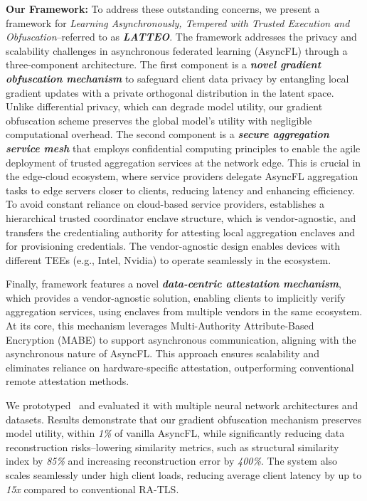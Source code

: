 \noindent
\textbf{Our Framework:}
To address these outstanding concerns, we present a framework for \emph{Learning Asynchronously, Tempered with Trusted Execution and Obfuscation}--referred to as \textit{\textbf{LATTEO}}. The \sysname framework addresses the privacy and scalability challenges in asynchronous federated learning (AsyncFL) through a three-component architecture. 
The first component is a \textit{\textbf{novel gradient obfuscation mechanism}} to safeguard client data privacy by entangling local gradient updates with a private orthogonal distribution in the latent space. Unlike differential privacy, which can degrade model utility, our gradient obfuscation scheme preserves the global model's utility with negligible computational overhead.
The second component is a \textit{\textbf{secure aggregation service mesh}} that employs confidential computing principles to enable the agile deployment of trusted aggregation services at the network edge. This is crucial in the edge-cloud ecosystem, where service providers delegate AsyncFL aggregation tasks to edge servers closer to clients, reducing latency and enhancing efficiency. To avoid constant reliance on cloud-based service providers, \sysname establishes a hierarchical trusted coordinator enclave structure, which is vendor-agnostic, and transfers the credentialing authority for attesting local aggregation enclaves and for provisioning credentials.
The vendor-agnostic design enables devices with different TEEs (e.g., Intel, Nvidia) to operate seamlessly in the ecosystem.    

Finally, \sysname framework features a novel \textit{\textbf{data-centric attestation mechanism}}, which provides a vendor-agnostic solution, enabling clients to implicitly verify aggregation services, using enclaves from multiple vendors in the same ecosystem. At its core, this mechanism leverages Multi-Authority Attribute-Based Encryption (MABE) to support asynchronous communication, aligning with the asynchronous nature of AsyncFL. This approach ensures scalability and eliminates reliance on hardware-specific attestation, outperforming conventional remote attestation methods.

We prototyped \sysname~and evaluated it with multiple neural network architectures and datasets. Results demonstrate that our gradient obfuscation mechanism preserves model utility, within {\em 1\%} of vanilla AsyncFL, while significantly reducing data reconstruction risks--lowering similarity metrics, such as structural similarity index by {\em 85\%} and increasing reconstruction error by {\em 400\%}. The system also scales seamlessly under high client loads, reducing average client latency by up to {\em 15x} compared to conventional RA-TLS.


